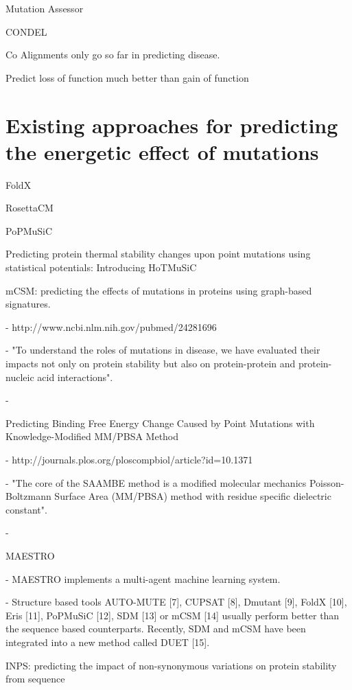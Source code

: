 Mutation Assessor


CONDEL

Co
Alignments only go so far in predicting disease.


Predict loss of function much better than gain of function



\section{Existing approaches for predicting the energetic effect of mutations}


FoldX


RosettaCM


PoPMuSiC


Predicting protein thermal stability changes upon point mutations using statistical potentials: Introducing HoTMuSiC


mCSM: predicting the effects of mutations in proteins using graph-based signatures.

  - http://www.ncbi.nlm.nih.gov/pubmed/24281696

  - "To understand the roles of mutations in disease, we have evaluated their impacts not only on protein stability but also on protein-protein and protein-nucleic acid interactions".

  - \cite{pires_mcsm:_2014}


Predicting Binding Free Energy Change Caused by Point Mutations with Knowledge-Modified MM/PBSA Method

  - http://journals.plos.org/ploscompbiol/article?id=10.1371%

  - "The core of the SAAMBE method is a modified molecular mechanics Poisson-Boltzmann Surface Area (MM/PBSA) method with residue specific dielectric constant".

  - \cite{petukh_predicting_2015}


MAESTRO \cite{laimer_maestro_2015}


  - MAESTRO implements a multi-agent machine learning system.

  - Structure based tools AUTO-MUTE [7], CUPSAT [8], Dmutant [9], FoldX [10], Eris [11], PoPMuSiC [12], SDM [13] or mCSM [14] usually perform better than the sequence based counterparts. Recently, SDM and mCSM have been integrated into a new method called DUET [15].


INPS: predicting the impact of non-synonymous variations on protein stability from sequence

